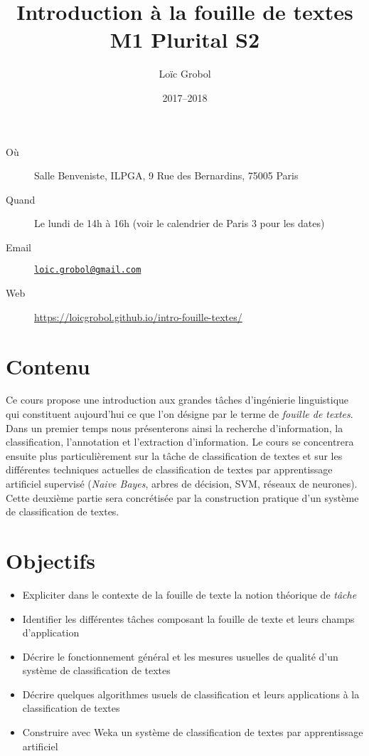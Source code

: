 \documentclass[a4paper, 11pt]{article}
\title{Introduction à la fouille de textes\\M1 Plurital S2}
\author{Loïc Grobol}
\date{2017–2018}
\begin{document}
\vspace*{-7em}
{\let\newpage\relax\maketitle}
\thispagestyle{main}

\begin{description}
    \item[Où] Salle Benveniste, ILPGA, 9 Rue des Bernardins, 75005 Paris
    \item[Quand] Le lundi de 14h à 16h (voir le calendrier de Paris 3 pour les dates)
    \item[Email] \href{mailto:loic.grobol@gmail.com}{\texttt{loic.grobol@gmail.com}}
    \item[Web] \url{https://loicgrobol.github.io/intro-fouille-textes/}
\end{description}

\section*{Contenu}
Ce cours propose une introduction aux grandes tâches d'ingénierie linguistique qui constituent aujourd'hui ce que l'on désigne par le terme de \emph{fouille de textes}.
Dans un premier temps nous présenterons ainsi la recherche d'information, la classification, l'annotation et l'extraction d'information.
Le  cours se  concentrera ensuite plus particulièrement sur la tâche de classification de textes et sur les différentes techniques actuelles de classification de textes par apprentissage artificiel supervisé (\emph{Naive Bayes}, arbres de décision, SVM, réseaux de neurones).
Cette deuxième partie sera concrétisée par la construction pratique d'un système de classification de textes.

\section*{Objectifs}

\begin{itemize}
    \item Expliciter dans le contexte de la fouille de texte la notion théorique de \emph{tâche}
    \item Identifier les différentes tâches composant la fouille de texte et leurs champs d'application
    \item Décrire le fonctionnement général et les mesures usuelles de qualité d'un système de classification de textes
    \item Décrire quelques algorithmes usuels de classification et leurs applications à la classification de textes
    \item Construire avec Weka un système de classification de textes par apprentissage artificiel
\end{itemize}
\end{document}
